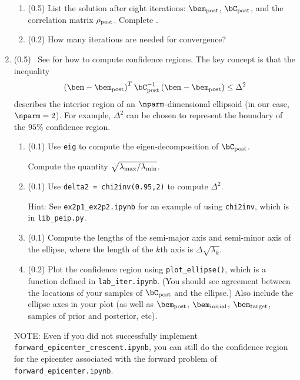 \documentclass[11pt,titlepage,fleqn]{article}
\newcommand{\tfile}{{\tt lab\_iter.ipynb}}
\newcommand{\tfileFE}{{\tt forward\_epicenter.ipynb}}
\newcommand{\tfileFEC}{{\tt forward\_epicenter\_crescent.ipynb}}
\begin{document}
\begin{enumerate}
\begin{enumerate}
\item (0.5) List the solution after eight iterations: $\bem_{\rm post}$, $\bC_{\rm post}$, and the correlation matrix $\rho_{\rm post}$. Complete . 

\item (0.2) How many iterations are needed for convergence?
\end{enumerate}


\pagebreak
\item (0.5) \ptag\ See \citet[][p.~34--36]{Aster} for how to compute confidence regions. The key concept is that the inequality
%
\begin{equation*}
\left(\bem - \bem_{\rm post} \right)^T \bC_{\rm post}^{-1} \left(\bem - \bem_{\rm post} \right) \le \Delta^2
\end{equation*}
%
describes the interior region of an $\nparm$-dimensional ellipsoid (in our case, $\nparm=2$). For example, $\Delta^2$ can be chosen to represent the boundary of the $95\%$ confidence region.
%
\begin{enumerate}
\item (0.1) Use \verb+eig+ to compute the eigen-decomposition of $\bC_{\rm post}$.

Compute the quantity $\sqrt{\lambda_{\rm max}/\lambda_{\rm min}}$.

\item (0.1) Use \verb+delta2 = chi2inv(0.95,2)+ to compute $\Delta^2$.

Hint: See \verb+ex2p1_ex2p2.ipynb+ for an example of using \verb+chi2inv+, which is in \verb+lib_peip.py+.

\item (0.1) Compute the lengths of the semi-major axis and semi-minor axis of the ellipse, where the length of the $k$th axis is $\Delta\sqrt{\lambda_k}$.

\item (0.2) Plot the confidence region using \verb+plot_ellipse()+, which is a function defined in \tfile. (You should see agreement between the locations of your samples of $\bC_{\rm post}$ and the ellipse.) Also include the ellipse axes in your plot (as well as $\bem_{\rm post}$, $\bem_{\rm initial}$, $\bem_{\rm target}$, samples of prior and posterior, etc).
\end{enumerate}

NOTE: Even if you did not successfully implement \tfileFEC, you can still do the confidence region for the epicenter associated with the forward problem of \tfileFE.

\end{enumerate}
\end{document}
